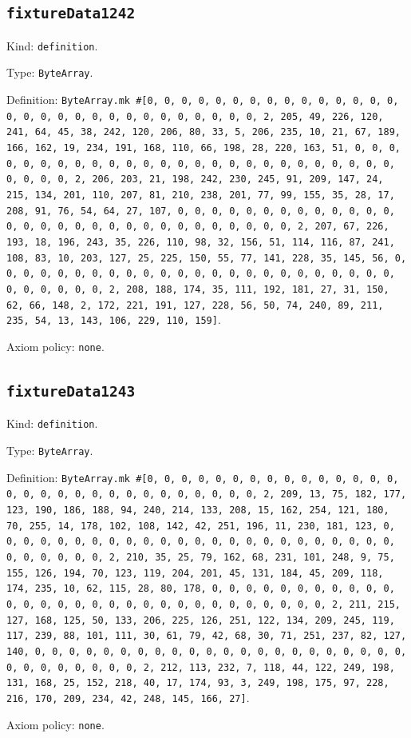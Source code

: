 \documentclass[11pt]{article}
\begin{document}
\subsection*{\texttt{fixtureData1242}}
\noindent Kind: \texttt{definition}.\par
\noindent Type: \texttt{ByteArray}.\par
\noindent Definition: \texttt{ByteArray.mk \#[0, 0, 0, 0, 0, 0, 0, 0, 0, 0, 0, 0, 0, 0, 0, 0, 0, 0, 0, 0, 0, 0, 0, 0, 0, 0, 0, 0, 0, 0, 2, 205, 49, 226, 120, 241, 64, 45, 38, 242, 120, 206, 80, 33, 5, 206, 235, 10, 21, 67, 189, 166, 162, 19, 234, 191, 168, 110, 66, 198, 28, 220, 163, 51, 0, 0, 0, 0, 0, 0, 0, 0, 0, 0, 0, 0, 0, 0, 0, 0, 0, 0, 0, 0, 0, 0, 0, 0, 0, 0, 0, 0, 0, 0, 2, 206, 203, 21, 198, 242, 230, 245, 91, 209, 147, 24, 215, 134, 201, 110, 207, 81, 210, 238, 201, 77, 99, 155, 35, 28, 17, 208, 91, 76, 54, 64, 27, 107, 0, 0, 0, 0, 0, 0, 0, 0, 0, 0, 0, 0, 0, 0, 0, 0, 0, 0, 0, 0, 0, 0, 0, 0, 0, 0, 0, 0, 0, 0, 2, 207, 67, 226, 193, 18, 196, 243, 35, 226, 110, 98, 32, 156, 51, 114, 116, 87, 241, 108, 83, 10, 203, 127, 25, 225, 150, 55, 77, 141, 228, 35, 145, 56, 0, 0, 0, 0, 0, 0, 0, 0, 0, 0, 0, 0, 0, 0, 0, 0, 0, 0, 0, 0, 0, 0, 0, 0, 0, 0, 0, 0, 0, 0, 2, 208, 188, 174, 35, 111, 192, 181, 27, 31, 150, 62, 66, 148, 2, 172, 221, 191, 127, 228, 56, 50, 74, 240, 89, 211, 235, 54, 13, 143, 106, 229, 110, 159]}.\par
\noindent Axiom policy: \texttt{none}.\par
\subsection*{\texttt{fixtureData1243}}
\noindent Kind: \texttt{definition}.\par
\noindent Type: \texttt{ByteArray}.\par
\noindent Definition: \texttt{ByteArray.mk \#[0, 0, 0, 0, 0, 0, 0, 0, 0, 0, 0, 0, 0, 0, 0, 0, 0, 0, 0, 0, 0, 0, 0, 0, 0, 0, 0, 0, 0, 0, 2, 209, 13, 75, 182, 177, 123, 190, 186, 188, 94, 240, 214, 133, 208, 15, 162, 254, 121, 180, 70, 255, 14, 178, 102, 108, 142, 42, 251, 196, 11, 230, 181, 123, 0, 0, 0, 0, 0, 0, 0, 0, 0, 0, 0, 0, 0, 0, 0, 0, 0, 0, 0, 0, 0, 0, 0, 0, 0, 0, 0, 0, 0, 0, 2, 210, 35, 25, 79, 162, 68, 231, 101, 248, 9, 75, 155, 126, 194, 70, 123, 119, 204, 201, 45, 131, 184, 45, 209, 118, 174, 235, 10, 62, 115, 28, 80, 178, 0, 0, 0, 0, 0, 0, 0, 0, 0, 0, 0, 0, 0, 0, 0, 0, 0, 0, 0, 0, 0, 0, 0, 0, 0, 0, 0, 0, 0, 0, 2, 211, 215, 127, 168, 125, 50, 133, 206, 225, 126, 251, 122, 134, 209, 245, 119, 117, 239, 88, 101, 111, 30, 61, 79, 42, 68, 30, 71, 251, 237, 82, 127, 140, 0, 0, 0, 0, 0, 0, 0, 0, 0, 0, 0, 0, 0, 0, 0, 0, 0, 0, 0, 0, 0, 0, 0, 0, 0, 0, 0, 0, 0, 0, 2, 212, 113, 232, 7, 118, 44, 122, 249, 198, 131, 168, 25, 152, 218, 40, 17, 174, 93, 3, 249, 198, 175, 97, 228, 216, 170, 209, 234, 42, 248, 145, 166, 27]}.\par
\noindent Axiom policy: \texttt{none}.\par
\end{document}
